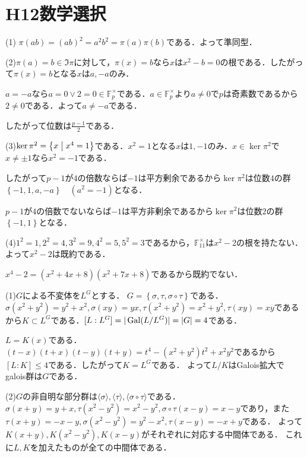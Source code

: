 \documentclass[
		book,
		head_space=20mm,
		foot_space=20mm,
		gutter=10mm,
		line_length=190mm
]{jlreq}
\begin{document}
\section{H12数学選択}
(1) $\pi(ab)=(ab)^2=a^2b^2=\pi(a)\pi(b)$である．よって準同型．

(2)$\pi(a)=b \in \Im \pi$に対して，$\pi(x)=b$なら$x$は$x^2-b=0$の根である．したがって$\pi(x)=b$となる$x$は$a,-a$のみ．

$a=-a$なら$a=0 \vee 2=0\in \mathbb{F}_p^\times$である．$a \in \mathbb{F}_p^\times$より$a\neq 0$で$p$は奇素数であるから$2 \neq 0$である．よって$a\neq -a$である．

したがって位数は$\frac{p-1}{2}$である．

(3)$\ker \pi^2=\left\{ x \mathrel{}\middle|\mathrel{} x^4=1\right\}$である．$x^2=1$となる$x$は$1,-1$のみ．$x \in \ker \pi^2$で$x\neq \pm 1$なら$x^2=-1$である．

したがって$p-1$が$4$の倍数ならば$-1$は平方剰余であるから$\ker \pi^2$は位数$4$の群$\left\{ -1,1,a,-a \right\}\quad(a^2=-1)$となる．

$p-1$が$4$の倍数でないならば$-1$は平方非剰余であるから$\ker \pi^2$は位数$2$の群$\left\{ -1,1 \right\}$となる．

(4)$1^2=1,2^2=4,3^2=9,4^2=5,5^2=3$であるから，$\mathbb{F}_{11}^\times$は$x^2-2$の根を持たない．よって$x^2-2$は既約である．

$x^4-2=(x^2+4x+8)(x^2+7x+8)$であるから既約でない．

(1)$G$による不変体を$L^G$とする．
$G=\left\{ \sigma,\tau,\sigma \circ \tau \right\}$である．
$\sigma(x^2+y^2)=y^2+x^2,\sigma(xy)=yx,\tau(x^2+y^2)=x^2+y^2,\tau(xy)=xy$であるから$K\subset L^G$である．$[L:L^G]=|\mathop{\mathrm{Gal}}(L/L^G)|=|G|=4$である．

$L=K(x)$である．$(t-x)(t+x)(t-y)(t+y)=t^4-(x^2+y^2)t^2+x^2y^2$であるから$[L:K]\le 4$である．したがって$K=L^G$である．
よって$L/K$はGalois拡大でgalois群は$G$である．

(2)$G$の非自明な部分群は$\langle \sigma \rangle,\langle \tau \rangle,\langle \sigma \circ \tau \rangle$である．
$\sigma(x+y)=y+x,\tau(x^2-y^2)=x^2-y^2,\sigma \circ \tau(x-y)=x-y$であり，また$\tau(x+y)=-x-y,\sigma(x^2-y^2)=y^2-x^2,\tau(x-y)=-x+y$である．
よって$K(x+y),K(x^2-y^2),K(x-y)$がそれぞれに対応する中間体である．
これに$L,K$を加えたものが全ての中間体である．
\end{document}
